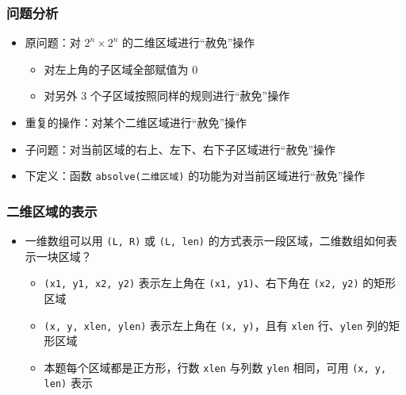 \begin{frame}[fragile]
    \frametitle{问题分析}

    \begin{itemize}
        \item 原问题：对 $2^n \times 2^n$ 的二维区域进行“赦免”操作
        \begin{itemize}
            \item 对左上角的子区域全部赋值为 $0$
            \item 对另外 $3$ 个子区域按照同样的规则进行“赦免”操作
        \end{itemize}
        \item 重复的操作：对某个二维区域进行“赦免”操作
        \item 子问题：对当前区域的右上、左下、右下子区域进行“赦免”操作
        \item 下定义：函数 \lstinline|absolve(二维区域)| 的功能为对当前区域进行“赦免”操作
    \end{itemize}
\end{frame}

\begin{frame}[fragile]
    \frametitle{二维区域的表示}

    \begin{itemize}[<+->]
        \item 一维数组可以用 \lstinline|(L, R)| 或 \lstinline|(L, len)| 的方式表示一段区域，二维数组如何表示一块区域？
        \begin{itemize}
            \item \lstinline|(x1, y1, x2, y2)| 表示左上角在 \lstinline|(x1, y1)|、右下角在 \lstinline|(x2, y2)| 的矩形区域
            \item \lstinline|(x, y, xlen, ylen)| 表示左上角在 \lstinline|(x, y)|，且有 \lstinline|xlen| 行、\lstinline|ylen| 列的矩形区域
            \item 本题每个区域都是正方形，行数 \lstinline|xlen| 与列数 \lstinline|ylen| 相同，可用 \lstinline|(x, y, len)| 表示
        \end{itemize}
    \end{itemize}
    
\end{frame}

